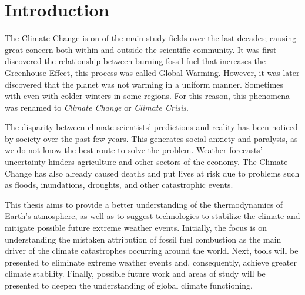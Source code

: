 \chapter*[Introduction]{Introduction}

The Climate Change is on of the main study fields over the last decades; causing great concern both within and outside the scientific community. It was first discovered the relationship between burning fossil fuel that increases the Greenhouse Effect, this process was called Global Warming. However, it was later discovered that the planet was not warming in a uniform manner. Sometimes with even with colder winters in some regions. For this reason, this phenomena was renamed to \textit{Climate Change} or \textit{Climate Crisis}.

The disparity between climate scientists' predictions and reality has been noticed by society over the past few years. This generates social anxiety and paralysis, as we do not know the best route to solve the problem. Weather forecasts' uncertainty hinders agriculture and other sectors of the economy. The Climate Change has also already caused deaths and put lives at risk due to problems such as floods, inundations, droughts, and other catastrophic events.

This thesis aims to provide a better understanding of the thermodynamics of Earth's atmosphere, as well as to suggest technologies to stabilize the climate and mitigate possible future extreme weather events. Initially, the focus is on understanding the mistaken attribution of fossil fuel combustion as the main driver of the climate catastrophes occurring around the world. Next, tools will be presented to eliminate extreme weather events and, consequently, achieve greater climate stability. Finally, possible future work and areas of study will be presented to deepen the understanding of global climate functioning.